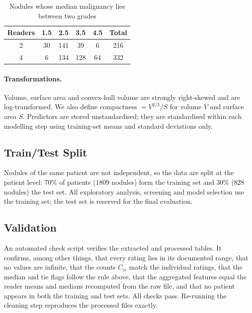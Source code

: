 \documentclass[12pt]{article}
\begin{document}
\begin{table}[H]
  \centering
  \begin{tabular}{|| c | c | c | c | c | c ||}
    \hline
    \textbf{Readers} & \textbf{1.5} & \textbf{2.5} & \textbf{3.5}
    & \textbf{4.5} & \textbf{Total} \\
    \hline\hline
    2 & 30 & 141 & 39 & 6 & 216 \\
    4 & 6 & 134 & 128 & 64 & 332 \\
    \hline
  \end{tabular}
  \caption{Nodules whose median malignancy lies between two grades}
  \label{tab:ties}
\end{table}

\paragraph{Transformations.}
Volume, surface area and convex-hull volume are strongly
right-skewed and are log-transformed. We also define
compactness $= V^{2/3}/S$ for volume $V$ and surface area $S$.
Predictors are stored unstandardised; they are standardised
within each modelling step using training-set means and standard
deviations only.

\subsection{Train/Test Split}

Nodules of the same patient are not independent, so the data are
split at the patient level: $70\%$ of patients ($1809$ nodules)
form the training set and $30\%$ ($828$ nodules) the test set.
All exploratory analysis, screening and model selection use the
training set; the test set is reserved for the final evaluation.

\subsection{Validation}

An automated check script verifies the extracted and processed
tables. It confirms, among other things, that every rating lies
in its documented range, that no values are infinite, that the
counts $C_{ir}$ match the individual ratings, that the median
and tie flags follow the rule above, that the aggregated features
equal the reader means and medians recomputed from the raw file,
and that no patient appears in both the training and test sets.
All checks pass. Re-running the cleaning step reproduces the
processed files exactly.
\end{document}
